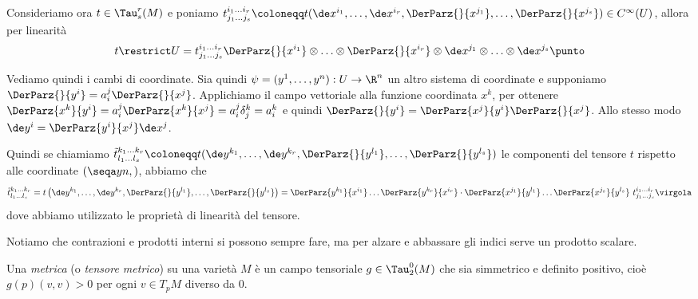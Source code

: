 
Consideriamo ora $t\in \Tau_s^r(M)$ e poniamo $t_{j_1\ldots j_s}^{i_1 \ldots i_r} \coloneqq t(\de x^{i_1}, \ldots, \de x^{i_r}, \DerParz{}{x^{j_1}}, \ldots, \DerParz{}{x^{j_s}}) \in C^\infty(U)$,
allora per linearità 
\begin{equation*}
	t\restrict U = t_{j_1\ldots j_s}^{i_1 \ldots i_r} \DerParz{}{x^{i_1}} \otimes \ldots \otimes \DerParz{}{x^{i_r}} \otimes \de x^{j_1}\otimes \ldots \otimes \de x^{j_s}\punto
\end{equation*}

Vediamo quindi i cambi di coordinate.
Sia quindi $\psi=(y^1,\ldots, y^n): U \to \R^n$ un altro sistema di coordinate e supponiamo $\DerParz{}{y^i} = a_i^j \DerParz{}{x^j}$. Applichiamo il campo vettoriale alla funzione coordinata $x^k$, per ottenere $\DerParz{x^k}{y^i} = a_i^j \DerParz{x^k}{x^j} = a_i^j \delta_j^k = a_i^k$ e quindi $\DerParz{}{y^i} = \DerParz{x^j}{y^i} \DerParz{}{x^j}$.
Allo stesso modo $\de y^i = \DerParz{y^i}{x^j} \de x^j$.

Quindi se chiamiamo $\tilde t_{l_1\ldots l_s}^{k_1\ldots k_r} \coloneqq t(\de y^{k_1},\ldots,\de y^{k_r}, \DerParz{}{y^{l_1}},\ldots, \DerParz{}{y^{l_s}})$ le componenti del tensore $t$ rispetto alle coordinate $(\seqa yn,)$, abbiamo che
\begin{equation*}
	\tilde t_{l_1\ldots l_s}^{k_1\ldots k_r} = t\left(\de y^{k_1},\ldots,\de y^{k_r}, \DerParz{}{y^{l_1}},\ldots, \DerParz{}{y^{l_s}}\right) = \DerParz{y^{k_1}}{x^{i_1}}\ldots\DerParz{y^{k_r}}{x^{i_r}}\cdot \DerParz{x^{j_1}}{y^{l_1}}\ldots\DerParz{x^{j_s}}{y^{l_s}}\ t_{j_1\ldots j_s}^{i_1\ldots i_r} \virgola
\end{equation*}
dove abbiamo utilizzato le proprietà di linearità del tensore.


Notiamo che contrazioni e prodotti interni si possono sempre fare, ma per alzare e abbassare gli indici serve un prodotto scalare.

\begin{definition}  
	Una \emph{metrica} (o \emph{tensore metrico}) su una varietà $M$ è un campo tensoriale $g \in \Tau_2^0(M)$ che sia simmetrico e definito positivo, cioè $g(p)(v,v)>0$ per ogni $v\in T_pM$ diverso da 0.
\end{definition}

